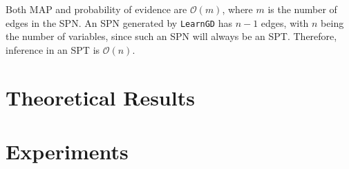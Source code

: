 \documentclass{amsart}
\theoremstyle{plain}
\numberwithin{equation}{section}
\newcommand{\bigo}{\mathcal{O}}
\newcommand{\code}[1]{\lstinline[mathescape=true]{#1}}
\begin{document}
Both MAP and probability of evidence are $\bigo(m)$, where $m$ is the number of edges in the SPN\@.
An SPN generated by \code{LearnGD} has $n-1$ edges, with $n$ being the number of variables, since
such an SPN will always be an SPT\@. Therefore, inference in an SPT is $\bigo(n)$.

\section{Theoretical Results}

\section{Experiments}


\newpage
\appendix

\newpage

\printbibliography[]
\end{document}
